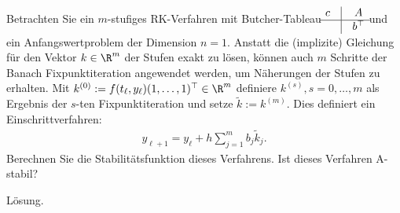 \begin{exercise}
Betrachten Sie ein $m$-stufiges RK-Verfahren mit Butcher-Tableau
$\begin{matrix}
  c & \vline & A \\ \hline & \vline & b^{\top}
\end{matrix}$ und ein Anfangswertproblem der Dimension $n = 1$.
Anstatt die (implizite) Gleichung für den Vektor $k \in \R^m$ der Stufen exakt
zu lösen, können auch $m$ Schritte der Banach Fixpunktiteration angewendet werden,
um Näherungen der Stufen zu erhalten. Mit $k^{(0)} := f(t_{\ell},y_{\ell})(1,\dots,1)^{\top} \in \R^m$
definiere $k^{(s)}, s = 0,\dots,m$ als Ergebnis der $s$-ten Fixpunktiteration und setze
$\widetilde{k} := k^{(m)}$. Dies definiert ein Einschrittverfahren:
\begin{align*}
  y_{\ell + 1} = y_{\ell} + h\sum_{j = 1}^m b_j \widetilde{k}_j.
\end{align*}
Berechnen Sie die Stabilitätsfunktion dieses Verfahrens. Ist dieses Verfahren
A-stabil?
\end{exercise}
\begin{solution}
Lösung.
\end{solution}
